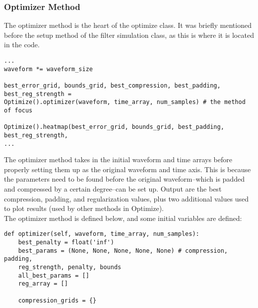 \documentclass[11pt, a4paper]{article}
\theoremstyle{definition}
\numberwithin{equation}{section}
\begin{document}
\subsubsection{Optimizer Method}

The optimizer method is the heart of the optimize class. It was briefly mentioned before the setup method of the filter simulation class, as this is where it is located in the code.

\begin{verbatim}
...
waveform *= waveform_size

best_error_grid, bounds_grid, best_compression, best_padding, best_reg_strength = 
Optimize().optimizer(waveform, time_array, num_samples) # the method of focus
    
Optimize().heatmap(best_error_grid, bounds_grid, best_padding, best_reg_strength, 
...
\end{verbatim}

The optimizer method takes in the initial waveform and time arrays before properly setting them up as the original waveform and time axis. This is because the parameters need to be found before the original waveform--which is padded and compressed by a certain degree--can be set up. Output are the best compression, padding, and regularization values, plus two additional values used to plot results (used by other methods in Optimize).
\\
The optimizer method is defined below, and some initial variables are defined:

\begin{verbatim}
def optimizer(self, waveform, time_array, num_samples):
    best_penalty = float('inf')
    best_params = (None, None, None, None, None) # compression, padding, 
    reg_strength, penalty, bounds
    all_best_params = []
    reg_array = []

    compression_grids = {}
\end{verbatim}
\end{document}
